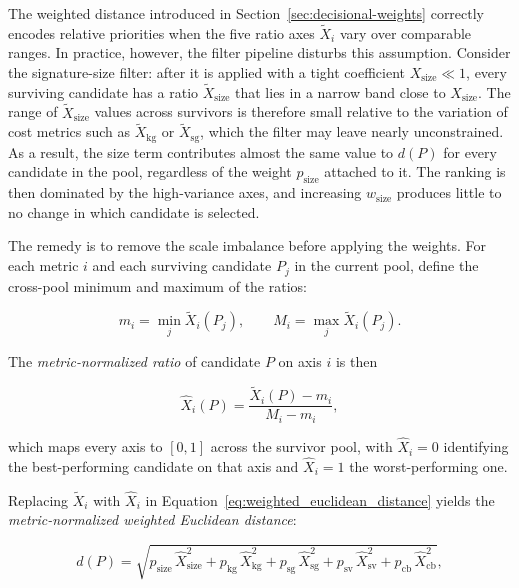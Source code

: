 The weighted distance introduced in Section~\ref{sec:decisional-weights} correctly encodes relative priorities when the five ratio axes $\widetilde{X}_i$ vary over comparable ranges.
In practice, however, the filter pipeline disturbs this assumption.
Consider the signature-size filter: after it is applied with a tight coefficient $X_{\text{size}} \ll 1$, every surviving candidate has a ratio $\widetilde{X}_{\text{size}}$ that lies in a narrow band close to $X_{\text{size}}$.
The range of $\widetilde{X}_{\text{size}}$ values across survivors is therefore small relative to the variation of cost metrics such as $\widetilde{X}_{\text{kg}}$ or $\widetilde{X}_{\text{sg}}$, which the filter may leave nearly unconstrained.
As a result, the size term contributes almost the same value to $d(P)$ for every candidate in the pool, regardless of the weight $p_{\text{size}}$ attached to it.
The ranking is then dominated by the high-variance axes, and increasing $w_{\text{size}}$ produces little to no change in which candidate is selected.

The remedy is to remove the scale imbalance before applying the weights.
For each metric $i$ and each surviving candidate $P_j$ in the current pool, define the cross-pool minimum and maximum of the ratios:

\begin{equation}
    m_i = \min_j \widetilde{X}_i(P_j), \qquad
    M_i = \max_j \widetilde{X}_i(P_j).
    \label{eq:metric_range}
\end{equation}

The \emph{metric-normalized ratio} of candidate $P$ on axis $i$ is then

\begin{equation}
    \widehat{X}_i(P) = \frac{\widetilde{X}_i(P) - m_i}{M_i - m_i},
    \label{eq:metric_norm}
\end{equation}

which maps every axis to $[0, 1]$ across the survivor pool, with $\widehat{X}_i = 0$ identifying the best-performing candidate on that axis and $\widehat{X}_i = 1$ the worst-performing one.

Replacing $\widetilde{X}_i$ with $\widehat{X}_i$ in Equation~\eqref{eq:weighted_euclidean_distance} yields the \emph{metric-normalized weighted Euclidean distance}:

\begin{equation}
    d(P) = \sqrt{
        p_{\text{size}}\,\widehat{X}_{\text{size}}^2 +
        p_{\text{kg}}\,\widehat{X}_{\text{kg}}^2 +
        p_{\text{sg}}\,\widehat{X}_{\text{sg}}^2 +
        p_{\text{sv}}\,\widehat{X}_{\text{sv}}^2 +
        p_{\text{cb}}\,\widehat{X}_{\text{cb}}^2
    },
    \label{eq:normalized_weighted_distance}
\end{equation}

